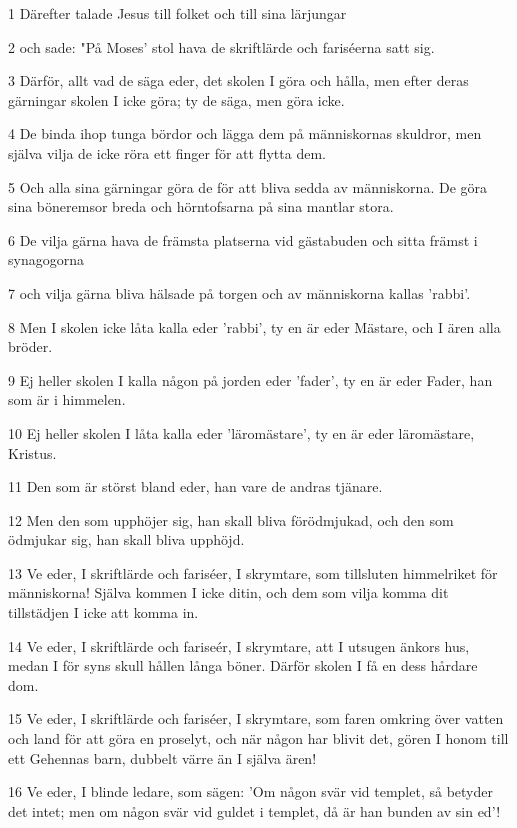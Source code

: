 \par 1 Därefter talade Jesus till folket och till sina lärjungar
\par 2 och sade: "På Moses' stol hava de skriftlärde och fariséerna satt sig.
\par 3 Därför, allt vad de säga eder, det skolen I göra och hålla, men efter deras gärningar skolen I icke göra; ty de säga, men göra icke.
\par 4 De binda ihop tunga bördor och lägga dem på människornas skuldror, men själva vilja de icke röra ett finger för att flytta dem.
\par 5 Och alla sina gärningar göra de för att bliva sedda av människorna. De göra sina böneremsor breda och hörntofsarna på sina mantlar stora.
\par 6 De vilja gärna hava de främsta platserna vid gästabuden och sitta främst i synagogorna
\par 7 och vilja gärna bliva hälsade på torgen och av människorna kallas 'rabbi'.
\par 8 Men I skolen icke låta kalla eder 'rabbi', ty en är eder Mästare, och I ären alla bröder.
\par 9 Ej heller skolen I kalla någon på jorden eder 'fader', ty en är eder Fader, han som är i himmelen.
\par 10 Ej heller skolen I låta kalla eder 'läromästare', ty en är eder läromästare, Kristus.
\par 11 Den som är störst bland eder, han vare de andras tjänare.
\par 12 Men den som upphöjer sig, han skall bliva förödmjukad, och den som ödmjukar sig, han skall bliva upphöjd.
\par 13 Ve eder, I skriftlärde och fariséer, I skrymtare, som tillsluten himmelriket för människorna! Själva kommen I icke ditin, och dem som vilja komma dit tillstädjen I icke att komma in.
\par 14 Ve eder, I skriftlärde och fariseér, I skrymtare, att I utsugen änkors hus, medan I för syns skull hållen långa böner. Därför skolen I få en dess hårdare dom.
\par 15 Ve eder, I skriftlärde och fariséer, I skrymtare, som faren omkring över vatten och land för att göra en proselyt, och när någon har blivit det, gören I honom till ett Gehennas barn, dubbelt värre än I själva ären!
\par 16 Ve eder, I blinde ledare, som sägen: 'Om någon svär vid templet, så betyder det intet; men om någon svär vid guldet i templet, då är han bunden av sin ed'!

